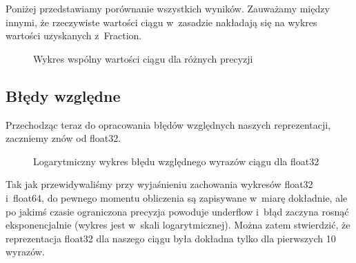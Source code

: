 Poniżej przedstawiamy porównanie wszystkich wyników. Zauważamy między innymi, że rzeczywiste wartości ciągu w~zasadzie nakładają się na wykres wartości uzyskanych z~Fraction.
\begin{figure}[ht!]
	\caption{Wykres wspólny wartości ciągu dla różnych precyzji}
	\label{zad2:graph6}
\end{figure}

\subsection{Błędy względne}
\quad Przechodząc teraz do opracowania błędów względnych naszych reprezentacji, zaczniemy znów od float32.
\begin{figure}[h!]
	\caption{Logarytmiczny wykres błędu względnego wyrazów ciągu dla float32}
	\label{zad2:graph7}
\end{figure}

Tak jak przewidywaliśmy przy wyjaśnieniu zachowania wykresów float32 i~float64, do pewnego momentu obliczenia są zapisywane w~miarę dokładnie, ale po jakimś czasie ograniczona precyzja powoduje underflow i~błąd zaczyna rosnąć eksponencjalnie (wykres jest w~skali logarytmicznej). Można zatem stwierdzić, że reprezentacja float32 dla naszego ciągu była dokładna tylko dla pierwszych 10 wyrazów.

